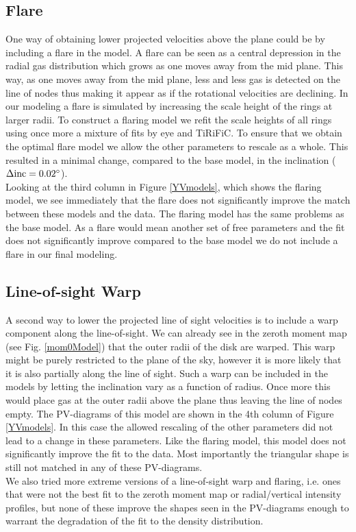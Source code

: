 \documentclass[useAMS,usenatbib]{mn2e}
\newcommand\tiri{{\sc TiRiFiC}}
\begin{document}
\subsection{Flare}
One way of obtaining lower projected velocities above the plane could be by including a flare in the model. A flare can be seen as a central depression in the radial gas distribution which grows as one moves away from the mid plane. This way, as one moves away from the mid plane, less and less gas is detected on the line of nodes thus making it appear as if the rotational velocities are declining. In our modeling a flare is simulated by increasing the scale height of the rings at larger radii. To construct a flaring model we refit the scale heights of all rings using once more a mixture of fits by eye and \tiri. To ensure that we obtain the optimal flare model we allow the other parameters to rescale as a whole. This resulted in a minimal change, compared to the base model, in the inclination ($\Delta {\rm inc} =0.02^{\circ}$).\\
\indent Looking at the third column in Figure \ref{YVmodels}, which shows the flaring model, we see immediately that the flare does not significantly improve the match between these models and the data. The flaring model has the same problems as the base model. As a flare would mean another set of free parameters and the fit does not significantly improve compared to the base model we do not include a flare in our final modeling.  
\subsection{Line-of-sight Warp}
A second way to lower the projected line of sight velocities is to include a warp component along the line-of-sight. We can already see in the zeroth moment map (see Fig. \ref{mom0Model}) that the outer radii of the disk are warped. This warp might be purely restricted to the plane of the sky, however it is more likely that it is also partially along the line of sight. Such a warp can be included in the models by letting the inclination vary as a function of radius. Once more this would place gas at the outer radii above the plane  thus leaving the line of nodes empty. The PV-diagrams of this model are shown in the 4th column of Figure \ref{YVmodels}. In this case the allowed rescaling of the other parameters did not lead to a change in these parameters. Like the flaring model, this model does not significantly improve the fit to the data. Most importantly the triangular shape is still not matched in any of these PV-diagrams. \\
\indent We also tried more  extreme versions of a line-of-sight warp and flaring, i.e. ones that were not the best fit to the zeroth moment map or radial/vertical intensity profiles, but none of these improve the shapes seen in the PV-diagrams enough to warrant the degradation of the fit to the density distribution. 
\end{document}
